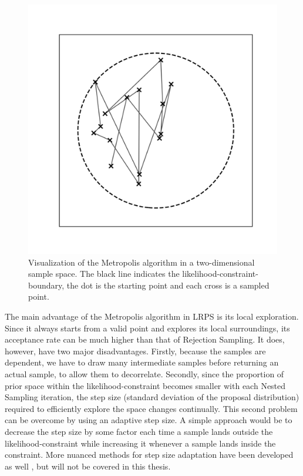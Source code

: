 \documentclass[12pt, a4paper]{report}
\begin{document}
\begin{figure}
    \centering
    \includegraphics[scale=0.5]{figs/metropolis_example.png}
    \caption{Visualization of the Metropolis algorithm in a two-dimensional sample space. The black line indicates the likelihood-constraint-boundary, the dot is the starting point and each cross is a sampled point.}
    \label{fig:metropolis_example}
\end{figure}

The main advantage of the Metropolis algorithm in LRPS is its local exploration.
Since it always starts from a valid point and explores its local surroundings, its acceptance rate can be much higher than that of Rejection Sampling.
It does, however, have two major disadvantages.
Firstly, because the samples are dependent, we have to draw many intermediate samples before returning an actual sample, to allow them to decorrelate.
Secondly, since the proportion of prior space within the likelihood-constraint becomes smaller with each Nested Sampling iteration, the step size (standard deviation of the proposal distribution) required to efficiently explore the space changes continually.
This second problem can be overcome by using an adaptive step size.
A simple approach would be to decrease the step size by some factor each time a sample lands outside the likelihood-constraint while increasing it whenever a sample lands inside the constraint.
More nuanced methods for step size adaptation have been developed as well \cite{automala}, but will not be covered in this thesis.
\end{document}
